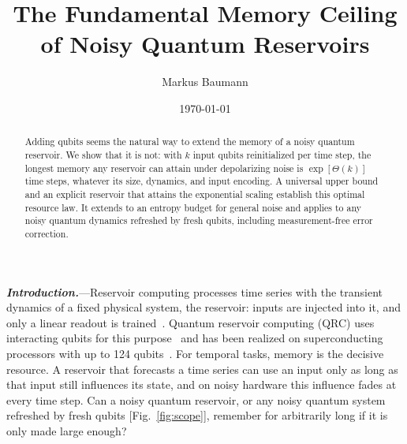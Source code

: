 \documentclass[aps,prl,twocolumn,superscriptaddress,floatfix]{revtex4-2}
\theoremstyle{plain}
\newcommand{\runin}[1]{\textit{\textbf{#1}}---}
\begin{document}
\let\SMaddcontentsline\addcontentsline
\renewcommand{\addcontentsline}[3]{}

\title{The Fundamental Memory Ceiling of Noisy Quantum Reservoirs}

\author{Markus Baumann}

\date{\today}

\begin{abstract}
Adding qubits seems the natural way to extend the memory of a noisy quantum reservoir. We show that it is not: with $k$ input qubits reinitialized per time step, the longest memory any reservoir can attain under depolarizing noise is $\exp[\Theta(k)]$ time steps, whatever its size, dynamics, and input encoding. A universal upper bound and an explicit reservoir that attains the exponential scaling establish this optimal resource law. It extends to an entropy budget for general noise and applies to any noisy quantum dynamics refreshed by fresh qubits, including measurement-free error correction.
\end{abstract}

\maketitle


\runin{Introduction.}Reservoir computing processes time series with the transient dynamics of a fixed physical system, the reservoir: inputs are injected into it, and only a linear readout is trained~\cite{Jaeger2001,Maass2002,JaegerHaas2004,Lukosevicius2009,Tanaka2019}. Quantum reservoir computing (QRC) uses interacting qubits for this purpose~\cite{Fujii2017,Nakajima2019,Mujal2021} and has been realized on superconducting processors with up to 124 qubits~\cite{Chen2020,Suzuki2022,Yasuda2023,Hu2024,Monzani2024,Dao2026}. For temporal tasks, memory is the decisive resource. A reservoir that forecasts a time series can use an input only as long as that input still influences its state, and on noisy hardware this influence fades at every time step. Can a noisy quantum reservoir, or any noisy quantum system refreshed by fresh qubits [Fig.~\ref{fig:scope}], remember for arbitrarily long if it is only made large enough?
\end{document}
